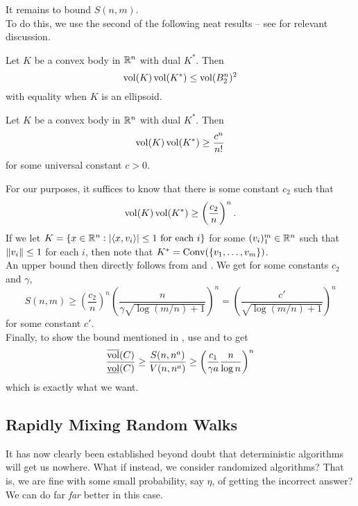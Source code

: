 It remains to bound $S(n,m)$.\\

To do this, we use the second of the following neat results -- see \cite{milman-inv-bs-ineq,Bourgain-Milman-inequality} for relevant discussion.

\begin{theorem}
\label{santalo inequality}
Let $K$ be a convex body in $\mathbb{R}^n$ with dual $K^*$. Then
\[ \operatorname{vol}(K)\operatorname{vol}(K^*) \leq \operatorname{vol}(B_2^n)^2 \]
with equality when $K$ is an ellipsoid.
\end{theorem}

\begin{ftheo}
\label{inverse santalo inequality}
Let $K$ be a convex body in $\mathbb{R}^n$ with dual $K^*$. Then
\[ \operatorname{vol}(K)\operatorname{vol}(K^*) \geq \frac{c^n}{n!} \]
for some universal constant $c > 0$.
\end{ftheo}

For our purposes, it suffices to know that there is some constant $c_2$ such that
\[ \operatorname{vol}(K)\operatorname{vol}(K^*) \geq \left(\frac{c_2}{n}\right)^n. \]
If we let $K=\{x\in\mathbb{R}^n:|\langle x,v_i\rangle| \leq 1\text{ for each $i$}\}$ for some $(v_i)_1^m\in\mathbb{R}^n$ such that $\left\lVert v_i\right\rVert\leq 1$ for each $i$, then note that $K^* = \operatorname{Conv}(\{v_1,\ldots,v_m\})$.\\
An upper bound then directly follows from  and . We get for some constants $c_2$ and $\gamma$,
\begin{equation}
\label{eqn: lower bound on S n m}
	S(n,m) \geq \left(\frac{c_2}{n}\right)^n \left(\frac{n}{\gamma\sqrt{ \log(m/n)+1}}\right)^n = \left(\frac{c'}{\sqrt{\log(m/n)+1}}\right)^n
\end{equation}
for some constant $c'$.\\

Finally, to show the bound mentioned in , use  and  to get
\[ \frac{\overline{\operatorname{vol}}(C)}{\underline{\operatorname{vol}}(C)} \geq \frac{S(n,n^a)}{V(n,n^a)} \geq \left(\frac{c_1}{\gamma a}\frac{n}{\log n}\right)^n \]
which is exactly what we want.

\subsection{Rapidly Mixing Random Walks}

It has now clearly been established beyond doubt that deterministic algorithms will get us nowhere. What if instead, we consider randomized algorithms? That is, we are fine with some small probability, say $\eta$, of getting the incorrect answer? We can do far \textit{far} better in this case.

